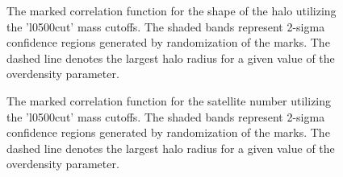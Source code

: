 \documentclass[usenatbib,usegraphicx,letterpaper]{mn2e}
\begin{document}
\begin{figure}
	\centering
	\caption{The marked correlation function for the shape of the halo utilizing the 'l0500cut' mass cutoffs. The shaded bands represent 2-sigma confidence regions generated by randomization of the marks. The dashed line denotes the largest halo radius for a given value of the overdensity parameter.}
\end{figure}

\begin{figure}
	\centering
	\caption{The marked correlation function for the satellite number utilizing the 'l0500cut' mass cutoffs. The shaded bands represent 2-sigma confidence regions generated by randomization of the marks. The dashed line denotes the largest halo radius for a given value of the overdensity parameter.}
\end{figure}
\end{document}
